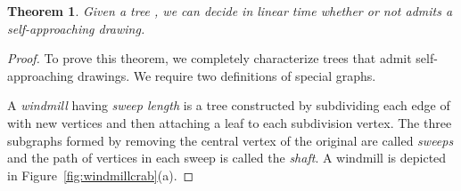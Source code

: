 \documentclass[11pt]{article}
\newtheorem{theorem}{Theorem}
\newcommand{\changeAL}[1]{{#1}}
\begin{document}
\begin{theorem}
\label{thm:drawableTrees}
Given a tree , we can decide in linear time whether or not  admits a self-approaching drawing.
\end{theorem}
\begin{proof}
To prove this theorem, we completely characterize trees that admit self-approaching drawings.  We require two definitions of special graphs.

A \emph{windmill} having \emph{sweep length}  is a tree constructed by subdividing
each edge of  with  new vertices
and then attaching a leaf to each subdivision vertex.
\changeAL{The three subgraphs formed by removing the central vertex of the original  are called \emph{sweeps} and the path of  vertices in each sweep is called the \emph{shaft}.}
A windmill is depicted in Figure~\ref{fig:windmillcrab}(a).


\end{proof}
\end{document}
